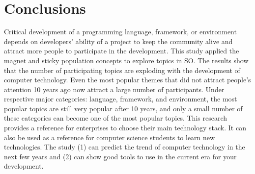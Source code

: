 \documentclass[conference]{IEEEtran}
\begin{document}


\section{Conclusions}
Critical development of a programming language, framework, or environment depends on developers' ability of a project to keep the community alive and attract more people to participate in the development. This study applied the magnet and sticky population concepts to explore topics in SO. The results show that the number of participating topics are exploding with the development of computer technology. Even the most popular themes that did not attract people’s attention 10 years ago now attract a large number of participants. Under respective major categories: language, framework, and environment, the most popular topics are still very popular after 10 years, and only a small number of these categories can become one of the most popular topics. This research provides a reference for enterprises to choose their main technology stack. It can also be used as a reference for computer science students to learn new technologies. The study (1) can predict the trend of computer technology in the next few years and (2) can show good tools to use in the current era for your development.



\end{document}
